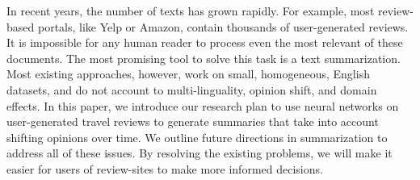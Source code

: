 In recent years, the number of texts has grown rapidly. For example, most review-based portals, like Yelp or Amazon, contain thousands of user-generated reviews. It is impossible for any human reader to process even the most relevant of these documents. The most promising tool to solve this task is a text summarization. Most existing approaches, however, work on small, homogeneous, English datasets, and do not account to multi-linguality, opinion shift, and domain effects. In this paper, we introduce our research plan to use neural networks on user-generated travel reviews to generate summaries that take into account shifting opinions over time. We outline future directions in summarization to address all of these issues. By resolving the existing problems, we will make it easier for users of review-sites to make more informed decisions.
